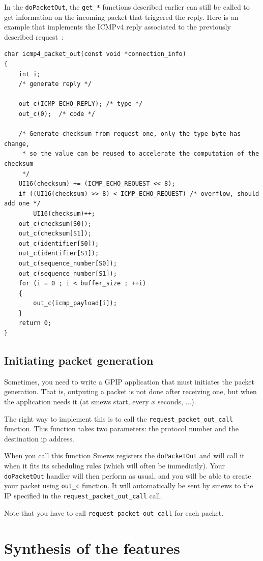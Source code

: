 \documentclass{report}
\begin{document}
In the \texttt{doPacketOut}, the \verb!get_*! functions described earlier can
still be called to get information on the incoming packet that triggered the
reply. Here is an example that implements the ICMPv4 reply associated to the
previously described request~:

\begin{lstlisting}
char icmp4_packet_out(const void *connection_info)
{
	int i;
	/* generate reply */

	out_c(ICMP_ECHO_REPLY); /* type */
	out_c(0);  /* code */

	/* Generate checksum from request one, only the type byte has change,
	 * so the value can be reused to accelerate the computation of the checksum
	 */
	UI16(checksum) += (ICMP_ECHO_REQUEST << 8);
	if ((UI16(checksum) >> 8) < ICMP_ECHO_REQUEST) /* overflow, should add one */
		UI16(checksum)++;
	out_c(checksum[S0]);
	out_c(checksum[S1]);
	out_c(identifier[S0]);
	out_c(identifier[S1]);
	out_c(sequence_number[S0]);
	out_c(sequence_number[S1]);
	for (i = 0 ; i < buffer_size ; ++i)
	{
		out_c(icmp_payload[i]);
	}
	return 0;
}
\end{lstlisting}


\subsection{Initiating packet generation}
\label{sec:init-pack-gener}

Sometimes, you need to write a GPIP application that must initiates the
packet generation. That is, outputing a packet is not done after receiving one,
but when the application needs it (at smews start, every $x$ seconds, ...).

The right way to implement this is to call the
\lstinline!request_packet_out_call! function. This function takes two
parameters: the protocol number and the destination ip address. 

When you call this function Smews registers the \verb!doPacketOut! and will
call it when it fits its scheduling rules (which will often be
immediatly). Your \lstinline!doPacketOut! handler will then perform as usual,
and you will be able to create your packet using \lstinline!out_c! function. It
will automatically be sent by smews to the IP specified in the
\lstinline!request_packet_out_call! call.

Note that you have to call \lstinline!request_packet_out_call! for each packet.

\section{Synthesis of the features}
\end{document}
